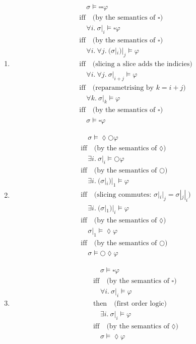 \documentclass{article}
\begin{document}
\begin{enumerate}
  \item {
    \begin{align*}
    &\quad  \sigma \vDash \square\square\varphi \\
    &\text{iff}\quad \text{(by the semantics of $\square$)} \\
    &\quad  \forall i.\ \sigma|_i \vDash \square\varphi \\
    &\text{iff}\quad \text{(by the semantics of $\square$)} \\
    &\quad  \forall i.\ \forall j.\ (\sigma|_i)|_j \vDash \varphi \\
    &\text{iff}\quad \text{(slicing a slice adds the indicies)} \\
    &\quad  \forall i.\ \forall j.\ \sigma|_{i+j} \vDash \varphi \\
    &\text{iff} \quad \text{(reparametrising by $k=i+j$)} \\
    &\quad  \forall k.\ \sigma|_k \vDash \varphi \\
    &\text{iff}\quad \text{(by the semantics of $\square$)} \\
    &\quad  \sigma \vDash \square\varphi
    \end{align*}
  }
  \item {
    \begin{align*}
    &\quad  \sigma \vDash \lozenge\bigcirc\varphi \\
    &\text{iff}\quad \text{(by the semantics of $\lozenge$)} \\
      &\quad  \exists i.\ \sigma|_i \vDash \bigcirc\varphi \\
    &\text{iff}\quad \text{(by the semantics of $\bigcirc$)} \\
    &\quad  \exists i.\ (\sigma|_i)|_1 \vDash \varphi \\
    &\text{iff}\quad \text{(slicing commutes: $\sigma|_i|_j = \sigma|_j|_i$)} \\
    &\quad  \exists i.\ (\sigma|_1)|_i \vDash \varphi \\
    &\text{iff} \quad \text{(by the semantics of $\lozenge$)} \\
    &\quad  \sigma|_1 \vDash \lozenge\varphi \\
    &\text{iff}\quad \text{(by the semantics of $\bigcirc$)} \\
    &\quad  \sigma \vDash \bigcirc\lozenge\varphi
    \end{align*}
  }
  \item {
    \begin{align*}
    &\quad  \sigma \vDash \square\varphi \\
    &\text{iff}\quad \text{(by the semantics of $\square$)} \\
    &\quad \forall i.\ \sigma|_i \vDash \varphi \\
    &\text{then}\quad \text{(first order logic)} \\
    &\quad  \exists i.\ \sigma|_i \vDash \varphi \\
    &\text{iff}\quad \text{(by the semantics of $\lozenge$)} \\
    &\quad  \sigma \vDash \lozenge\varphi
    \end{align*}
  }
\end{enumerate}
\end{document}
